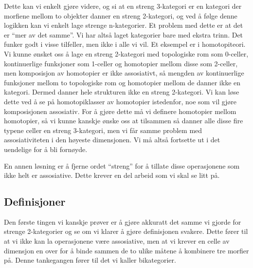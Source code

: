 Dette kan vi enkelt gjøre videre, og si at en streng 3-kategori er en kategori der morfiene mellom to objekter danner en streng 2-kategori, og ved å følge denne logikken kan vi enkelt lage strenge n-kategorier. 
Et problem med dette er at det er ``mer av det samme''. 
Vi har altså laget kategorier bare med ekstra trinn. 
Det funker godt i visse tilfeller, men ikke i alle vi vil. 
Et eksempel er i homotopiteori. 
Vi kunne ønsket oss å lage en streng 2-kategori med topologiske rom som 0-celler, kontinuerlige funksjoner som 1-celler og homotopier mellom disse som 2-celler, men komposisjon av homotopier er ikke assosiativt, så mengden av kontinuerlige funksjoner mellom to topologiske rom og homotopier mellom de danner ikke en kategori. 
Dermed danner hele strukturen ikke en streng 2-kategori. 
Vi kan løse dette ved å se på homotopiklasser av homotopier istedenfor, noe som vil gjøre komposisjonen assosiativ. 
For å gjøre dette må vi definere homotopier mellom homotopier, så vi kunne kanskje ønske oss at tilsammen så danner alle disse fire typene celler en streng 3-kategori, men vi får samme problem med assosiativiteten i den høyeste dimensjonen. 
Vi må altså fortsette ut i det uendelige for å bli fornøyde. 

En annen løsning er å fjerne ordet ``streng'' for å tillate disse operasjonene som ikke helt er assosiative. 
Dette krever en del arbeid som vi skal se litt på.


\subsection{Definisjoner}

Den første tingen vi kanskje prøver er å gjøre akkuratt det samme vi gjorde for strenge 2-kategorier og se om vi klarer å gjøre definisjonen svakere. 
Dette fører til at vi ikke kan la operasjonene være assosiative, men at vi krever en celle av dimensjon en over for å binde sammen de to ulike måtene å kombinere tre morfier på. 
Denne tankegangen fører til det vi kaller bikategorier. 

